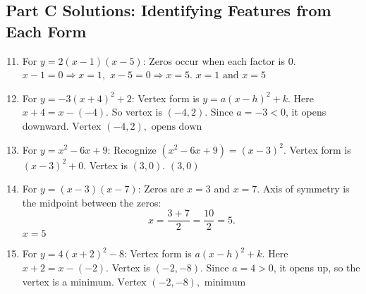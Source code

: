\documentclass[12pt]{article}
\begin{document}
\subsection*{Part C Solutions: Identifying Features from Each Form}
\begin{enumerate}
  \setcounter{enumi}{10}
  \item For \(y = 2(x - 1)(x - 5)\):  
  Zeros occur when each factor is 0.  
  \(x - 1 = 0 \Rightarrow x = 1,\)  
  \(x - 5 = 0 \Rightarrow x = 5.\)  
  \(\boxed{x = 1 \text{ and } x = 5}\)

  \item For \(y = -3(x + 4)^2 + 2\):  
  Vertex form is \(y = a(x - h)^2 + k\). Here \(x + 4 = x - (-4)\).  
  So vertex is \((-4, 2)\).  
  Since \(a = -3 < 0\), it opens downward.  
  \(\boxed{\text{Vertex } (-4, 2), \text{ opens down}}\)

  \item For \(y = x^2 - 6x + 9\):  
  Recognize \((x^2 - 6x + 9) = (x - 3)^2.\)  
  Vertex form is \((x - 3)^2 + 0.\)  
  Vertex is \((3, 0)\).  
  \(\boxed{(3, 0)}\)

  \item For \(y = (x - 3)(x - 7)\):  
  Zeros are \(x = 3\) and \(x = 7.\)  
  Axis of symmetry is the midpoint between the zeros:  
  \[
  x = \frac{3 + 7}{2} = \frac{10}{2} = 5.
  \]
  \(\boxed{x = 5}\)

  \item For \(y = 4(x + 2)^2 - 8\):  
  Vertex form is \(a(x - h)^2 + k\). Here \(x + 2 = x - (-2)\).  
  Vertex is \((-2, -8)\).  
  Since \(a = 4 > 0\), it opens up, so the vertex is a minimum.  
  \(\boxed{\text{Vertex } (-2, -8), \text{ minimum}}\)
\end{enumerate}
\end{document}
